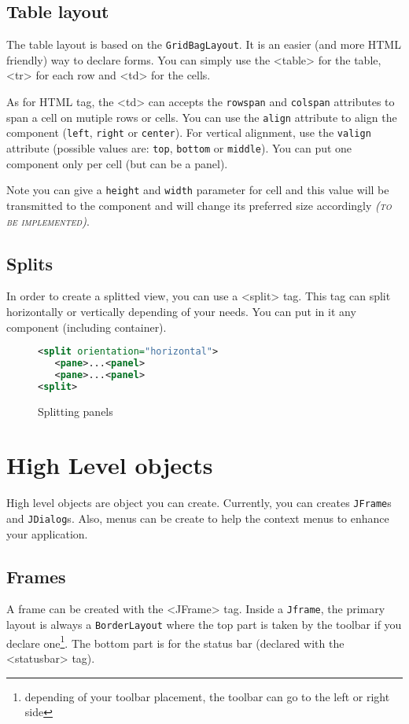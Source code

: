 \documentclass[a4paper,onecolumn,10pt]{book}
\newcommand{\jclass}[1]{\texttt{\small #1}}
\newcommand{\tag}[1]{\textsf{<#1>}}
\newcommand{\implement}{\emph{\small \textsc{(to be implemented)}}}
\begin{document}
\subsection{Table layout}
The table layout is based on the \jclass{GridBagLayout}. It is an
easier (and more HTML friendly) way to declare forms. You can simply
use the \tag{table} for the table, \tag{tr} for each row and \tag{td}
for the cells.

As for HTML tag, the \tag{td} can accepts the \verb|rowspan| and
\verb|colspan| attributes to span a cell on mutiple rows or cells.
You can use the \verb|align| attribute to align the component
(\verb|left|, \verb|right| or \verb|center|). For vertical
alignment, use the \verb|valign| attribute (possible values are:
\verb|top|, \verb|bottom| or \verb|middle|). You can put one
component only per cell (but can be a panel).


Note you can give a \verb|height| and \verb|width| parameter for
cell and this value will be transmitted to the component and will
change its preferred size accordingly \implement.


\subsection{\label{sec:JSplitPane}Splits}
In order to create a splitted view, you can use a \tag{split} tag.
This tag can split horizontally or vertically depending of your needs.
You can put in it any component (including container).
 

\begin{figure}[htb]
\begin{lstlisting}[language=XML]
<split orientation="horizontal">
   <pane>...<panel>
   <pane>...<panel>
<split>
\end{lstlisting}
\caption{Splitting panels}\label{fig:split}
\end{figure}

\section{High Level objects}
High level objects are object you can create. Currently,
you can creates \jclass{JFrame}s and \jclass{JDialog}s. Also,
menus can be create to help the context menus to enhance your
application.

\subsection{Frames}
A frame can be created with the \tag{JFrame} tag. Inside a 
\jclass{Jframe}, the primary layout is always a \jclass{BorderLayout}
where the top part is taken by the toolbar if you declare 
one\footnote{depending of your toolbar placement, the toolbar can go
to the left or right side}. The bottom part is for the status bar
(declared with the \tag{statusbar} tag).
\end{document}
